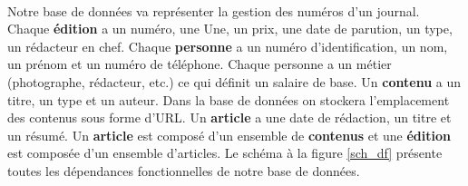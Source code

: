 \paragraph{}{
    Notre base de données va représenter la gestion des numéros d'un journal. Chaque \textbf{édition} a un numéro, une Une, un prix, une date de parution, un type, un rédacteur en chef. Chaque \textbf{personne} a un numéro d'identification, un nom, un prénom et un numéro de téléphone. Chaque personne a un métier (photographe, rédacteur, etc.) ce qui définit un salaire de base. Un \textbf{contenu} a un titre, un type et un auteur. Dans la base de données on stockera l'emplacement des contenus sous forme d'URL. Un \textbf{article} a une date de rédaction, un titre et un résumé. Un \textbf{article} est composé d'un ensemble de \textbf{contenus} et une \textbf{édition} est composée d'un ensemble d'articles. \newline
    Le schéma à la figure \ref{sch_df} présente toutes les dépendances fonctionnelles de notre base de données.
}
